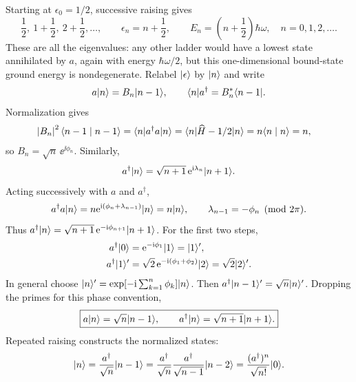 Starting at $\epsilon_0=1/2$, successive raising gives
\[
 \frac12,\ 1+\frac12,\ 2+\frac12,\ldots,
 \qquad \epsilon_n=n+\frac12,\qquad
 E_n=\left(n+\frac12\right)\hbar\omega,\quad n=0,1,2,\ldots.
\]
These are all the eigenvalues: any other ladder would have a lowest
state annihilated by $a$, again with energy $\hbar\omega/2$, but this
one-dimensional bound-state ground energy is nondegenerate.
Relabel $\lvert \epsilon\rangle$ by $\lvert n\rangle$ and write
\[
 a\lvert n\rangle=B_n\lvert n-1\rangle,\qquad
 \langle n\rvert a^\dagger=B_n^*\langle n-1\rvert.
\]
Normalization gives
\begin{align*}
 \left\lvert B_n\right\rvert^2\langle n-1\mid n-1\rangle
 &=\langle n\rvert a^\dagger a\lvert n\rangle
 =\langle n\rvert \widehat H-1/2\lvert n\rangle=n\langle n\mid n\rangle=n,
\end{align*}
so $B_n=\sqrt n\,\ee^{\ii\phi_n}$. Similarly,
\[
 a^\dagger\lvert n\rangle=\sqrt{n+1}\,\mathrm{e}^{\mathrm{i}\lambda_n}\lvert n+1\rangle.
\]
Acting successively with $a$ and $a^\dagger$,
\[
 a^\dagger a\lvert n\rangle
 =n\mathrm{e}^{\mathrm{i}(\phi_n+\lambda_{n-1})}\lvert n\rangle=n\lvert n\rangle,
 \qquad\lambda_{n-1}=-\phi_n\pmod{2\pi}.
\]
Thus $a^\dagger\lvert n\rangle=\sqrt{n+1}\,\mathrm{e}^{-\mathrm{i}\phi_{n+1}}\lvert n+1\rangle$.
For the first two steps,
\begin{align*}
 a^\dagger\lvert 0\rangle&=\mathrm{e}^{-\mathrm{i}\phi_1}\lvert 1\rangle=\lvert 1\rangle',\\
 a^\dagger\lvert 1\rangle'&=\sqrt2\,
       \mathrm{e}^{-\mathrm{i}(\phi_1+\phi_2)}\lvert 2\rangle=\sqrt2\lvert 2\rangle'.
\end{align*}
In general choose
$\lvert n\rangle'=\exp[-\mathrm{i}\sum_{k=1}^n\phi_k]\lvert n\rangle$.
Then $a^\dagger\lvert n-1\rangle'=\sqrt n\lvert n\rangle'$.
Dropping the primes for this phase convention,
\[
 \boxed{a\lvert n\rangle=\sqrt n\lvert n-1\rangle,\qquad
        a^\dagger\lvert n\rangle=\sqrt{n+1}\lvert n+1\rangle.}
\]
Repeated raising constructs the normalized states:
\[
 \lvert n\rangle=\frac{a^\dagger}{\sqrt n}\lvert n-1\rangle
 =\frac{a^\dagger}{\sqrt n}\frac{a^\dagger}{\sqrt{n-1}}\lvert n-2\rangle
 =\frac{(a^\dagger)^n}{\sqrt{n!}}\lvert 0\rangle.
\]

